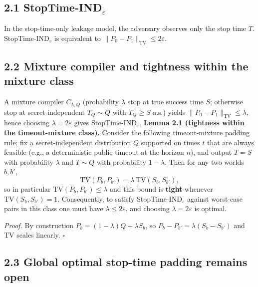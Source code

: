 \documentclass[11pt]{article}
\begin{document}
\hypertarget{stoptime-ind_varepsilon}{%
\subsection{\texorpdfstring{2.1
StopTime-IND\(_\varepsilon\)}{2.1 StopTime-IND\_\textbackslash varepsilon}}\label{stoptime-ind_varepsilon}}

In the stop-time-only leakage model, the adversary observes only the
stop time \(T\). StopTime-IND\(_\varepsilon\) is equivalent to
\(\|P_0-P_1\|_{\mathrm{TV}}\le 2\varepsilon\).

\hypertarget{mixture-compiler-and-tightness-within-the-mixture-class}{%
\subsection{2.2 Mixture compiler and tightness within the mixture
class}\label{mixture-compiler-and-tightness-within-the-mixture-class}}

A mixture compiler \(C_{\lambda,Q}\) (probability \(\lambda\) stop at
true success time \(S\); otherwise stop at secret-independent
\(T_Q\sim Q\) with \(T_Q\ge S\) a.s.) yields
\(\|P_0-P_1\|_{\mathrm{TV}}\le \lambda\), hence choosing
\(\lambda=2\varepsilon\) gives StopTime-IND\(_\varepsilon\).
\textbf{Lemma 2.1 (tightness within the timeout-mixture class).}
Consider the following timeout-mixture padding rule: fix a
secret-independent distribution \(Q\) supported on times \(t\) that are
always feasible (e.g., a deterministic public timeout at the horizon
\(n\)), and output \(T=S\) with probability \(\lambda\) and \(T\sim Q\)
with probability \(1-\lambda\). Then for any two worlds \(b,b'\), \[
\mathrm{TV}(P_b,P_{b'}) = \lambda\,\mathrm{TV}(S_b,S_{b'}),
\] so in particular \(\mathrm{TV}(P_b,P_{b'})\le \lambda\) and this
bound is \textbf{tight} whenever \(\mathrm{TV}(S_b,S_{b'})=1\).
Consequently, to satisfy StopTime-IND\(_\varepsilon\) against worst-case
pairs in this class one must have \(\lambda\le 2\varepsilon\), and
choosing \(\lambda=2\varepsilon\) is optimal.

\emph{Proof.} By construction \(P_b=(1-\lambda)Q+\lambda S_b\), so
\(P_b-P_{b'}=\lambda(S_b-S_{b'})\) and TV scales linearly. \(\square\)

\hypertarget{global-optimal-stop-time-padding-remains-open}{%
\subsection{2.3 Global optimal stop-time padding remains
open}\label{global-optimal-stop-time-padding-remains-open}}
\end{document}
